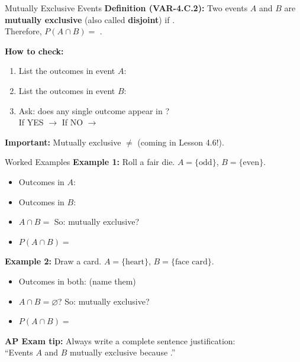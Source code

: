 \documentclass[10pt]{article}
\begin{document}
\vspace{0.1in}

\begin{notesbox}{Mutually Exclusive Events}
\small
\textbf{Definition (VAR-4.C.2):} Two events $A$ and $B$ are \textbf{mutually exclusive}
(also called \textbf{disjoint}) if .\\[6pt]
Therefore, $P(A \cap B) = $ .

\vspace{10pt}
\textbf{How to check:}
\begin{enumerate}[leftmargin=1.5em, itemsep=4pt]
  \item List the outcomes in event $A$: 
  \item List the outcomes in event $B$: 
  \item Ask: does any single outcome appear in ?\\
        If YES $\to$  \quad If NO $\to$ 
\end{enumerate}

\vspace{10pt}
\textbf{Important:} Mutually exclusive $\neq$  (coming in Lesson 4.6!).
\end{notesbox}

\vspace{0.1in}

\begin{notesbox}{Worked Examples}
\small
\textbf{Example 1:} Roll a fair die. $A = \{\text{odd}\}$, $B = \{\text{even}\}$.
\begin{itemize}[itemsep=3pt]
  \item Outcomes in $A$: 
  \item Outcomes in $B$: 
  \item $A \cap B = $ \ans{$\varnothing$} \quad So: mutually exclusive? 
  \item $P(A \cap B) = $ 
\end{itemize}

\vspace{8pt}
\textbf{Example 2:} Draw a card. $A = \{\text{heart}\}$, $B = \{\text{face card}\}$.
\begin{itemize}[itemsep=3pt]
  \item Outcomes in both:  (name them)
  \item $A \cap B = \varnothing$?  \quad So: mutually exclusive? 
  \item $P(A \cap B) = $ 
\end{itemize}

\vspace{8pt}
\textbf{AP Exam tip:} Always write a complete sentence justification:\\[4pt]
``Events $A$ and $B$  mutually exclusive because .''
\end{notesbox}
\end{document}
